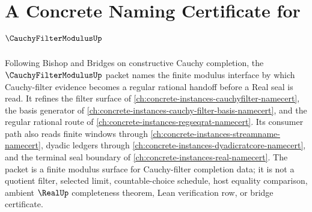 \chapter{A Concrete Naming Certificate for $\CauchyFilterModulusUp$}
\label{ch:concrete-instances-cauchy-filter-modulus-namecert}

Following Bishop and Bridges on constructive Cauchy completion, the $\CauchyFilterModulusUp$ packet names the finite modulus interface by which Cauchy-filter evidence becomes a regular rational handoff before a Real seal is read. It refines the filter surface of \autoref{ch:concrete-instances-cauchyfilter-namecert}, the basis generator of \autoref{ch:concrete-instances-cauchy-filter-basis-namecert}, and the regular rational route of \autoref{ch:concrete-instances-regseqrat-namecert}. Its consumer path also reads finite windows through \autoref{ch:concrete-instances-streamname-namecert}, dyadic ledgers through \autoref{ch:concrete-instances-dyadicratcore-namecert}, and the terminal seal boundary of \autoref{ch:concrete-instances-real-namecert}. The packet is a finite modulus surface for Cauchy-filter completion data; it is not a quotient filter, selected limit, countable-choice schedule, host equality comparison, ambient $\RealUp$ completeness theorem, Lean verification row, or bridge certificate.

